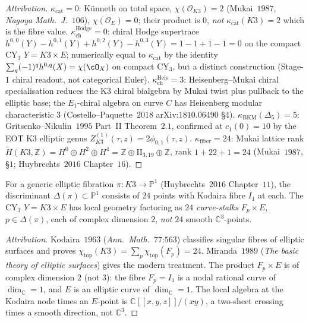 \begin{proof}[Attribution]
$\kappa_{\mathrm{cat}} = 0$: K\"unneth on total space, $\chi(\mathcal{O}_{K3}) = 2$ (Mukai~$1987$, \emph{Nagoya Math.\ J.}~$106$), $\chi(\mathcal{O}_E) = 0$; their product is $0$, \emph{not} $\kappa_{\mathrm{cat}}(K3) = 2$ which is the fibre value. $\kappa_{\mathrm{ch}}^{\mathrm{Hodge}} = 0$: chiral Hodge supertrace $h^{0,0}(Y) - h^{0,1}(Y) + h^{0,2}(Y) - h^{0,3}(Y) = 1 - 1 + 1 - 1 = 0$ on the compact CY$_3$ $Y = K3 \times E$; numerically equal to $\kappa_{\mathrm{cat}}$ by the identity $\sum_q (-1)^q h^{0, q}(X) = \chi(\cO_X)$ on compact CY$_3$, but a distinct construction (Stage-$1$ chiral readout, not categorical Euler). $\kappa_{\mathrm{ch}}^{\mathrm{Heis}} = 3$: Heisenberg--Mukai chiral specialisation reduces the K3 chiral bialgebra by Mukai twist plus pullback to the elliptic base; the $E_1$-chiral algebra on curve $C$ has Heisenberg modular characteristic $3$ (Costello--Paquette~$2018$ arXiv:$1810.06490$ \S$4$). $\kappa_{\mathrm{BKM}}(\Delta_5) = 5$: Gritsenko--Nikulin~$1995$ Part~II Theorem~$2.1$, confirmed at $c_1(0) = 10$ by the EOT K3 elliptic genus $Z^{(1)}_{K3}(\tau, z) = 2\phi_{0, 1}(\tau, z)$. $\kappa_{\mathrm{fiber}} = 24$: Mukai lattice rank $\widetilde H(K3, \mathbb{Z}) = H^0 \oplus H^2 \oplus H^4 = \mathbb{Z} \oplus \mathrm{II}_{3, 19} \oplus \mathbb{Z}$, rank $1 + 22 + 1 = 24$ (Mukai~$1987$, \S$1$; Huybrechts~$2016$ Chapter~$16$).
\end{proof}

\begin{theorem}
\label{thm:k3xE-24-curve-stalks-not-points}
For a generic elliptic fibration $\pi \colon K3 \to \mathbb{P}^1$ (Huybrechts~$2016$ Chapter~$11$), the discriminant $\Delta(\pi) \subset \mathbb{P}^1$ consists of $24$ points with Kodaira fibre $I_1$ at each. The CY$_3$ $Y = K3 \times E$ has local geometry factoring as $24$ \emph{curve-stalks} $F_p \times E$, $p \in \Delta(\pi)$, each of complex dimension $2$, \emph{not} $24$ smooth $\mathbb{C}^3$-points.
\end{theorem}

\begin{proof}[Attribution]
Kodaira~$1963$ (\emph{Ann.\ Math.}~$77$:$563$) classifies singular fibres of elliptic surfaces and proves $\chi_{\mathrm{top}}(K3) = \sum_p \chi_{\mathrm{top}}(F_p) = 24$. Miranda~$1989$ (\emph{The basic theory of elliptic surfaces}) gives the modern treatment. The product $F_p \times E$ is of complex dimension $2$ (not $3$): the fibre $F_p = I_1$ is a nodal rational curve of $\dim_{\mathbb{C}} = 1$, and $E$ is an elliptic curve of $\dim_{\mathbb{C}} = 1$. The local algebra at the Kodaira node times an $E$-point is $\mathbb{C}[[x, y, z]]/(xy)$, a two-sheet crossing times a smooth direction, not $\mathbb{C}^3$.
\end{proof}

